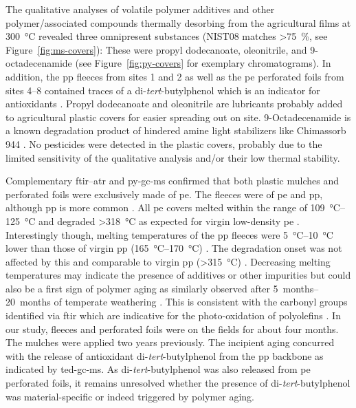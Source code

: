 The qualitative analyses of volatile polymer additives and other polymer\-/associated compounds thermally desorbing from the agricultural films at \SI{300}{\degreeCelsius} revealed three omnipresent substances (NIST08 matches \SI{>75}{\percent}, see Figure~\ref{fig:ms-covers}): These were propyl dodecanoate, oleonitrile, and 9-octadecenamide (see Figure~\ref{fig:py-covers} for exemplary chromatograms). In addition, the \ac{pp} fleeces from sites 1 and 2 as well as the \ac{pe} perforated foils from sites 4--8 contained traces of a di-\textit{tert}-butylphenol which is an indicator for antioxidants \citep{HahladakisOverview2018}. Propyl dodecanoate and oleonitrile are lubricants probably added to agricultural plastic covers for easier spreading out on site. 9-Octadecenamide is a known degradation product of hindered amine light stabilizers like Chimassorb 944 \citep{HaiderLoss2001}. No pesticides were detected in the plastic covers, probably due to the limited sensitivity of the qualitative analysis and/or their low thermal stability.

Complementary \ac{ftir}--\ac{atr} and \ac{py-gc-ms} confirmed that both plastic mulches and perforated foils were exclusively made of \ac{pe}. The fleeces were of \ac{pe} and \ac{pp}, although \ac{pp} is more common \citep{HamouzInfluence2011}. All \ac{pe} covers melted within the range of \SIrange{109}{125}{\degreeCelsius} and degraded \SI{>318}{\degreeCelsius} as expected for virgin low-density \ac{pe} \citep{BeylerThermal2002}. Interestingly though, melting temperatures of the \ac{pp} fleeces were \SIrange[range-phrase={ to }]{5}{10}{\degreeCelsius} lower than those of virgin \ac{pp} (\SIrange{165}{170}{\degreeCelsius}) \citep{BeylerThermal2002,TochacekPolymer2019}. The degradation onset was not affected by this and comparable to virgin \ac{pp} (\SI{>315}{\degreeCelsius}) \citep{BeylerThermal2002}. Decreasing melting temperatures may indicate the presence of additives or other impurities but could also be a first sign of polymer aging as similarly observed after \SIrange{5}{20}{months} of temperate weathering \citep{TochacekPolymer2019}. This is consistent with the carbonyl groups identified via \ac{ftir} which are indicative for the photo-oxidation of polyolefins \citep{GrauseChanges2020}. In our study, fleeces and perforated foils were on the fields for about four months. The mulches were applied two years previously. The incipient aging concurred with the release of antioxidant di-\textit{tert}-butylphenol from the \ac{pp} backbone as indicated by \ac{ted-gc-ms}. As di-\textit{tert}-butylphenol was also released from \ac{pe} perforated foils, it remains unresolved whether the presence of di-\textit{tert}-butylphenol was material-specific or indeed triggered by polymer aging.

